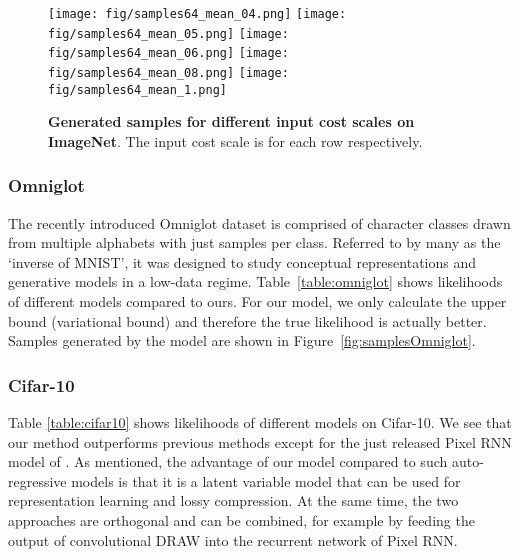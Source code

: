 \documentclass{article}
\begin{document}
\begin{figure}[h!]
\vspace{-0.3cm}
\begin{center}
\begin{minipage}{0.5\textwidth}
\texttt{[image: fig/samples64\_mean\_04.png]}
\texttt{[image: fig/samples64\_mean\_05.png]}
\texttt{[image: fig/samples64\_mean\_06.png]}
\texttt{[image: fig/samples64\_mean\_08.png]}
\texttt{[image: fig/samples64\_mean\_1.png]}
\caption{\textbf{Generated samples for different input cost scales on  ImageNet}. The input cost scale  is  for each row respectively. 
}
\label{fig:samples64}
\vspace{-0.65cm}
\end{minipage}
\end{center}
\end{figure}

\subsubsection{Omniglot}

The recently introduced Omniglot dataset \cite{lake2015human} is comprised of  character classes drawn from multiple alphabets with just  samples per class. Referred to by many as the `inverse of MNIST', it was designed to study conceptual representations and generative models in a low-data regime. Table~\ref{table:omniglot} shows likelihoods of different models compared to ours. For our model, we only calculate the upper bound (variational bound) and therefore the true likelihood is actually better. Samples generated by the model are shown in Figure~\ref{fig:samplesOmniglot}.


\subsubsection{Cifar-10}

Table \ref{table:cifar10} shows likelihoods of different models on Cifar-10. We see that our method outperforms previous methods except for the just released Pixel RNN model of \citep{oord2016pixel}. As mentioned, the advantage of our model compared to such auto-regressive models is that it is a latent variable model that can be used for representation learning and lossy compression. At the same time, the two approaches are orthogonal and can be combined, for example by feeding the output of convolutional DRAW into the recurrent network of Pixel RNN.
\end{document}
